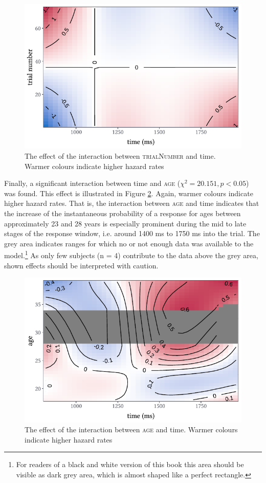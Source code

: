 \begin{figure}
    \centering
    \includegraphics[]{figures/fig7.5.pdf}
    \caption{The effect of the interaction between \textsc{trialNumber} and time. Warmer colours indicate higher hazard rates}
    \label{fig:7_5}
\end{figure}

Finally, a significant interaction between time and \textsc{age} ($χ^{2}=20.151, p<0.05$) was found. This effect is illustrated in Figure \ref{fig:7_6}. Again, warmer colours indicate higher hazard rates. That is, the interaction between \textsc{age} and time indicates that the increase of the instantaneous probability of a response for ages between approximately 23 and 28 years is especially prominent during the mid to late stages of the response window, i.e. around 1400 ms to 1750 ms into the trial. The grey area indicates ranges for which no or not enough data was available to the model.\footnote{For readers of a black and white version of this book this area should be visible as dark grey area, which is almost shaped like a perfect rectangle.} As only few subjects (n = 4) contribute to the data above the grey area, shown effects should be interpreted with caution. 

\begin{figure}
    \centering
    \includegraphics[]{figures/fig7.6.pdf}
    \caption{The effect of the interaction between \textsc{age} and time. Warmer colours indicate higher hazard rates}
    \label{fig:7_6}
\end{figure}

